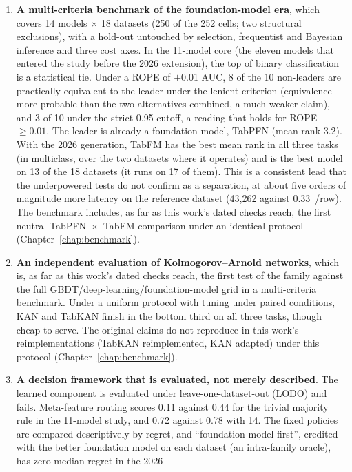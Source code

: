 \begin{enumerate}
  \item \textbf{A multi-criteria benchmark of the foundation-model
    era}, which covers 14 models $\times$ 18 datasets (250 of the 252
    cells; two structural exclusions), with a hold-out untouched
    by selection, frequentist and Bayesian inference and three cost
    axes. In the 11-model core (the eleven models that entered the study
    before the 2026 extension), the top of binary classification is a
    statistical tie. Under a ROPE
    of $\pm$0.01 AUC, 8 of the 10 non-leaders are practically equivalent to the leader under the lenient criterion (equivalence more probable than the two alternatives combined, a much weaker claim), and 3 of 10 under the strict 0.95 cutoff, a reading that holds for ROPE
    $\geq 0.01$. The leader is already a foundation model, TabPFN
    (mean rank 3.2). With the 2026 generation, TabFM has the best
    mean rank in all three tasks (in multiclass, over the two
    datasets where it operates) and is the best model on 13 of the 18 datasets (it runs on 17 of them). This is a consistent lead that the
    underpowered tests do not confirm as a separation, at about five
    orders of magnitude more latency on the reference
    dataset (43{,}262 against 0.33~\us/row). The benchmark includes, as
    far as this work's dated checks reach, the first neutral
    TabPFN~$\times$~TabFM comparison under an identical protocol
    (Chapter~\ref{chap:benchmark}).
  \item \textbf{An independent evaluation of Kolmogorov--Arnold
    networks}, which is, as far as this work's dated checks reach, the first
    test of the family against the full
    GBDT/deep-learning/foundation-model grid in a multi-criteria
    benchmark. Under a uniform protocol with tuning under paired
    conditions, KAN and TabKAN finish in the bottom third on all
    three tasks, though cheap to serve. The original claims
    do not reproduce in this work's reimplementations (TabKAN reimplemented,
    KAN adapted) under this protocol (Chapter~\ref{chap:benchmark}).
  \item \textbf{A decision framework that is evaluated, not merely
    described}. The learned component is evaluated under
    leave-one-dataset-out (LODO) and fails. Meta-feature routing
    scores 0.11 against 0.44 for the trivial majority rule in the
    11-model study, and 0.72 against 0.78 with 14. The fixed policies
    are compared descriptively by regret, and ``foundation model first'', credited with the better foundation model on each dataset (an intra-family oracle), has zero median regret in the 2026

\end{enumerate}

